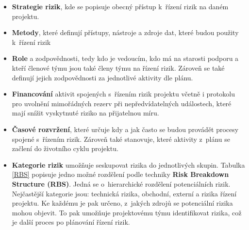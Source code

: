 \begin{itemize}
    \item \textbf{Strategie rizik}, kde se popisuje obecný přístup k~řízení rizik na daném projektu.
    \item \textbf{Metody}, které definují přístupy, nástroje a zdroje dat, které budou použity k~řízení rizik
    \item \textbf{Role} a zodpovědnosti, tedy kdo je vedoucím, kdo má na starosti podporu a kteří členové týmu jsou také členy týmu na řízení rizik. Zároveň se také definují jejich zodpovědnosti za jednotlivé aktivity dle plánu.
    \item \textbf{Financování} aktivit spojených s~řízením rizik projektu včetně i protokolu pro uvolnění mimořádných rezerv při nepředvídatelných událostech, které mají snížit vyskytnuté riziko na přijatelnou míru.
    \item \textbf{Časové rozvržení}, které určuje kdy a jak často se budou provádět procesy spojené s~řízením rizik. Zároveň také stanovuje, které aktivity z~plánu se začlení do životního cyklu projektu.
    \item \textbf{Kategorie rizik} umožňuje seskupovat rizika do jednotlivých skupin. Tabulka \ref{RBS} popisuje jedno možné rozdělení podle techniky \textbf{Risk Breakdown Structure (RBS)}. Jedná se o~hierarchické rozdělení potenciálních rizik. Nejčastější kategorie jsou: technická rizika, obchodní, externí a rizika řízení projektu. Ke každému je pak určeno, z~jakých zdrojů se potenciální rizika mohou objevit. To pak umožňuje projektovému týmu identifikovat rizika, což je další proces po plánování řízení rizik.
    

\end{itemize}
